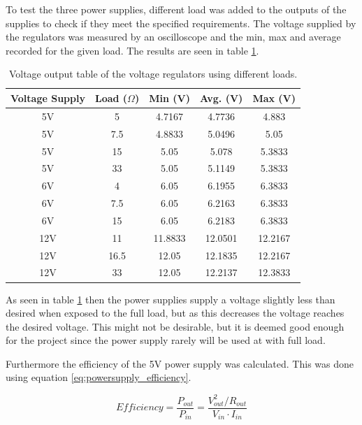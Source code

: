 To test the three power supplies, different load was added to the outputs of the supplies to check if they meet the specified requirements.
The voltage supplied by the regulators was measured by an oscilloscope and the min, max and average recorded for the given load.
The results are seen in table \ref{tab:voltagesupply}.

\begin{table}[H]	
\centering
\begin{tabular}{|c|c|c|c|c|}
\hline
Voltage Supply & Load ($\Omega$) & Min (V) & Avg. (V) & Max (V) \\ \hline
5V & 5 & 4.7167 & 4.7736 & 4.883 \\ \hline
5V & 7.5 & 4.8833 & 5.0496 & 5.05 \\ \hline
5V & 15 & 5.05 & 5.078 & 5.3833 \\ \hline
5V & 33 & 5.05 & 5.1149 & 5.3833 \\ \hline
6V & 4 & 6.05 & 6.1955 & 6.3833 \\ \hline
6V & 7.5 & 6.05 & 6.2163 & 6.3833 \\ \hline
6V & 15 & 6.05 & 6.2183 & 6.3833 \\ \hline
12V & 11 & 11.8833 & 12.0501 & 12.2167 \\ \hline
12V & 16.5 & 12.05 & 12.1835 & 12.2167 \\ \hline
12V & 33 & 12.05 & 12.2137 & 12.3833 \\ \hline
\end{tabular}
\caption{Voltage output table of the voltage regulators using different loads.}
\label{tab:voltagesupply}
\end{table}



As seen in table \ref{tab:voltagesupply} then the power supplies supply a voltage slightly less than desired when exposed to the full load, but as this decreases the voltage reaches the desired voltage.
This might not be desirable, but it is deemed good enough for the project since the power supply rarely will be used at with full load.


Furthermore the efficiency of the 5V power supply was calculated.
This was done using equation \ref{eq:powersupply_efficiency}.

\begin{equation}
Efficiency = \frac{P_{out}}{P_{in}} = \frac{V_{out}^2 / R_{out}}{V_{in} \cdot I_{in}}
\label{eq:powersupply_efficiency}
\end{equation}

